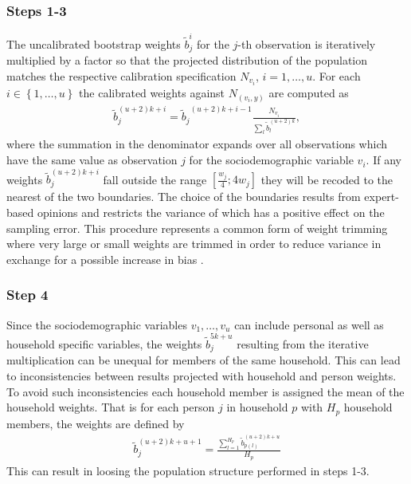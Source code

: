 \documentclass{scrartcl}\usepackage[]{graphicx}\usepackage[]{color}
\begin{document}
\subsubsection{Steps 1-3}
The uncalibrated bootstrap weights $\tilde{b}_j^{i}$ for the $j$-th observation is iteratively multiplied by a factor so that the projected distribution of the population matches the respective calibration specification $N_{v_i}$, $i=1,\ldots,u$.
For each $i \in \left\{1,\ldots,u\right\}$ the calibrated weights against $N_{(v_i,y)}$ are computed as
\begin{align*}
  \tilde{b}_j^{(u+2)k+i} = {\tilde{b}_j}^{(u+2)k+i-1}\frac{N_{v_i}}{{\sum\limits_l} {\tilde{b}}_l^{(u+2)k}},
\end{align*}
where the summation in the denominator expands over all observations which have the same value as observation $j$ for the sociodemographic variable $v_i$.
If any weights $\tilde{b}_j^{(u+2)k+i}$ fall outside the range $\left[\frac{w_j}{4};4w_j\right]$ they will be recoded to the nearest of the two boundaries. The choice of the boundaries results from expert-based opinions and restricts the variance of which has a positive effect on the sampling error. This procedure represents a common form of weight trimming where very large or small weights are trimmed in order to reduce variance in exchange for a possible increase in bias \citep{potter90,potter93}.

\subsubsection{Step 4}
Since the sociodemographic variables $v_1,\ldots,v_u$ can include personal as well as household specific variables, the weights $\tilde{b}_j^{5k+u}$   resulting from the iterative multiplication can be unequal for members of the same household. This can lead to inconsistencies between results projected with household and person weights. To avoid such inconsistencies each household member is assigned the mean of the household weights. That is for each person $j$ in household $p$ with $H_p$ household members, the weights are defined by
\begin{align*}
  \tilde{b}_j^{(u+2)k+u+1} = \frac{{\sum\limits_{l=1}^{H_p}} {\tilde{b}}_{p(l)}^{(u+2)k+u}}{H_p}
\end{align*}
This can result in loosing the population structure performed in steps 1-3.
\end{document}
